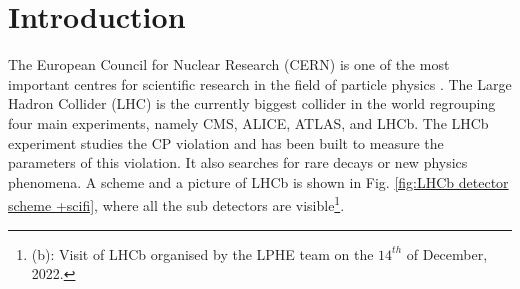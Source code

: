 \chapter{Introduction}
\label{ch:intro}


%

The European Council for Nuclear Research (CERN) is one of the most important centres for scientific research in the field of particle physics \cite{TheCERN}. The Large Hadron Collider (LHC) is the currently biggest collider in the world regrouping four main experiments, namely CMS, ALICE, ATLAS, and LHCb. 
The LHCb experiment studies the CP violation and has been built to measure the parameters of this violation. It also searches for rare decays or new physics phenomena. A scheme and a picture of LHCb is shown in Fig. \ref{fig:LHCb detector scheme +scifi}, where all the sub detectors are visible\footnote{(b): Visit of LHCb organised by the LPHE team on the $14^{th}$ of December, 2022.}.  
